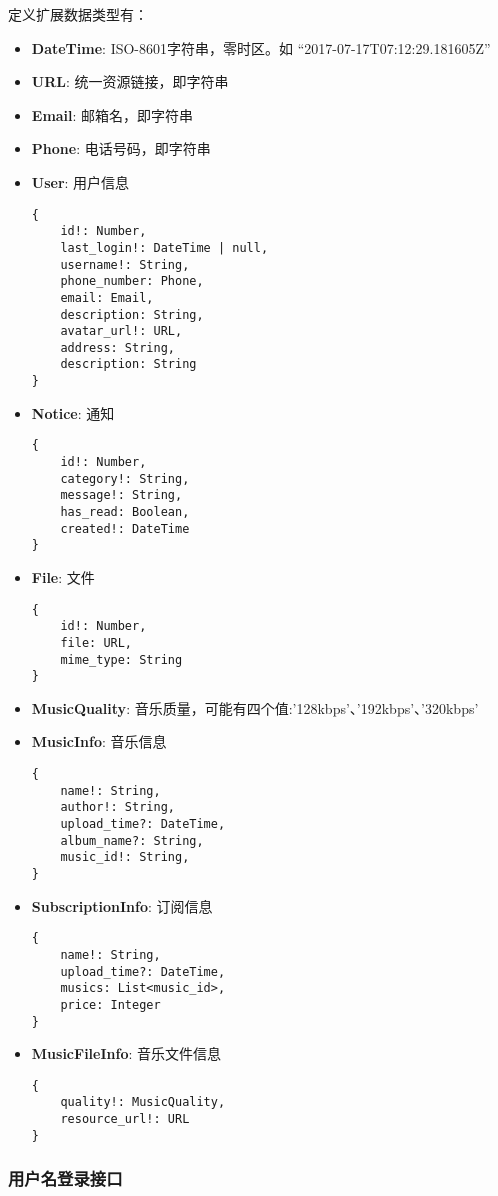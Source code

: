 定义扩展数据类型有：
\begin{itemize}
	\item \textbf{DateTime}: ISO-8601字符串，零时区。如 “2017-07-17T07:12:29.181605Z”
	\item \textbf{URL}: 统一资源链接，即字符串
	\item \textbf{Email}: 邮箱名，即字符串
	\item \textbf{Phone}: 电话号码，即字符串
	\item \textbf{User}: 用户信息
	\begin{lstlisting}[numbers=none, frame=none]
{
	id!: Number,
	last_login!: DateTime | null,
	username!: String,
	phone_number: Phone,
	email: Email,
	description: String,
	avatar_url!: URL,
	address: String,
	description: String
}
	\end{lstlisting}
	\item \textbf{Notice}: 通知
	\begin{lstlisting}[numbers=none, frame=none]
{
	id!: Number,
	category!: String,
	message!: String,
	has_read: Boolean,
	created!: DateTime
}
	\end{lstlisting}
	\item \textbf{File}: 文件
	\begin{lstlisting}[numbers=none, frame=none]
{
	id!: Number,
	file: URL,
	mime_type: String
}
	\end{lstlisting}
	\item \textbf{MusicQuality}: 音乐质量，可能有四个值:'128kbps'、'192kbps'、'320kbps'
	\item \textbf{MusicInfo}: 音乐信息
	\begin{lstlisting}[numbers=none, frame=none]
{
	name!: String,
	author!: String,
	upload_time?: DateTime,
	album_name?: String,
	music_id!: String,
}
	\end{lstlisting}
	\item \textbf{SubscriptionInfo}: 订阅信息
	\begin{lstlisting}[numbers=none, frame=none]
{
	name!: String,
	upload_time?: DateTime,
	musics: List<music_id>,
	price: Integer
}
    \end{lstlisting}
	\item \textbf{MusicFileInfo}: 音乐文件信息
	\begin{lstlisting}[numbers=none, frame=none]
{
	quality!: MusicQuality,
	resource_url!: URL
}
	\end{lstlisting}
\end{itemize}


\subsubsection{用户名登录接口}

